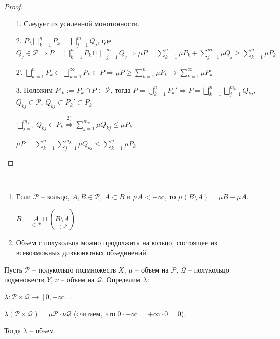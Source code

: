 \begin{proof}~
    \begin{enumerate}
        \item[1.] Следует из усиленной монотонности.
        \item[2.] $P\setminus \bigsqcup\limits_{k=1}^n P_k = \bigsqcup\limits_{j=1}^m Q_j$, где $Q_j \in \mathcal{P}\Rightarrow
        P = \bigsqcup\limits_{k=1}^n P_k \sqcup \bigsqcup\limits_{j=1}^m Q_j\Rightarrow \mu P = \sum\limits_{k=1}^n \mu P_k +
        \sum\limits_{j=1}^m \mu Q_j \geq \sum\limits_{k=1}^n \mu P_k$

        \item[2'.] $\bigsqcup\limits_{k=1}^n P_k \subset \bigsqcup\limits_{k=1}^\infty P_k \subset P \Rightarrow
        \mu P \geq \sum\limits_{k=1}^n \mu P_k \rightarrow \sum\limits_{k=1}^\infty \mu P_k$
        \item[3.] Положим $P'_k:= P_k \cap P \in \mathcal{P} $, тогда $ P = \bigcup\limits_{k=1}^n P_k' \Rightarrow P = \bigsqcup\limits_{k=1}^n \bigsqcup\limits_{j=1}^{m_k} Q_{kj}$,
        $Q_{kj}\in \mathcal{P}$, $Q_{kj}\subset P_k' \subset P_k$

        $\bigsqcup\limits_{j=1}^{m_k} Q_{kj} \subset P_k \overset{2)}{\Rightarrow} \sum\limits_{j=1}^{m_k}\mu Q_{kj} \leq \mu P_k$

        $\mu P =  \sum\limits_{k=1}^{n} \sum\limits_{j=1}^{m_k} \mu Q_{kj} \leq  \sum\limits_{k=1}^{n} \mu P_k$
    \end{enumerate}
\end{proof}

\begin{remark}~
    \begin{enumerate} 
        \item Если $\mathcal{P}$ – кольцо, $A, B\in \mathcal{P}$, $A\subset B$ и $\mu A <+\infty$, то $\mu (B \setminus A)=\mu B - \mu A$.
        
        $B = \underset{\in \mathcal{P}}{A}\sqcup (\underset{\in \mathcal{P}}{B\setminus A})$
        \item Объем с полукольца можно продолжить на кольцо, состоящее из всевозможных дизъюнктных объединений.
    \end{enumerate}
\end{remark}

\begin{theorem}
    Пусть $\mathcal{P}$ – полукольцо подмножеств $X$, $\mu$ – объем на $\mathcal{P}$, 
    $\mathcal{Q}$ – полукольцо подмножеств $Y$, $\nu$ – объем на $\mathcal{Q}$. Определим $\lambda$:

    $\lambda: \mathcal{P}\times \mathcal{Q}\rightarrow [0, +\infty]$.

    $\lambda(\mathcal{P}\times \mathcal{Q}) = \mu \mathcal{P} \cdot \nu \mathcal{Q}$ (считаем,
    что $0 \cdot + \infty = +\infty \cdot 0 = 0$). 
    
    Тогда $\lambda$ – объем.
\end{theorem}

